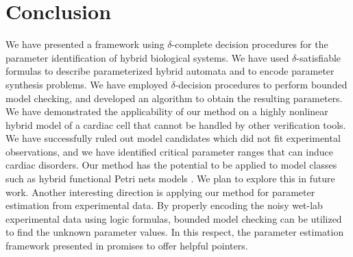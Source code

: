 \section{Conclusion}
We have presented a framework using $\delta$-complete decision procedures for the parameter identification 
of hybrid biological systems. We have used $\delta$-satisfiable formulas to describe parameterized hybrid automata 
and to encode parameter synthesis problems. We have employed $\delta$-decision procedures to perform bounded model 
checking, and developed an algorithm to obtain the resulting parameters.
We have demonstrated the applicability of our method on a highly nonlinear hybrid model of a cardiac cell that cannot
be handled by other verification tools. We have successfully ruled out model candidates which did not fit 
experimental observations, and we have identified critical parameter ranges that can induce cardiac disorders.
Our method has the potential to be applied to model classes such as hybrid functional Petri nets models \citep{hfpn}. 
We plan to explore this in future work. Another interesting direction is applying our method for parameter estimation 
from experimental data. By properly encoding the noisy wet-lab experimental data using logic formulas, bounded model 
checking can be utilized to find the unknown parameter values. In this respect, the parameter 
estimation framework presented in \cite{liu13} promises to offer helpful pointers.









